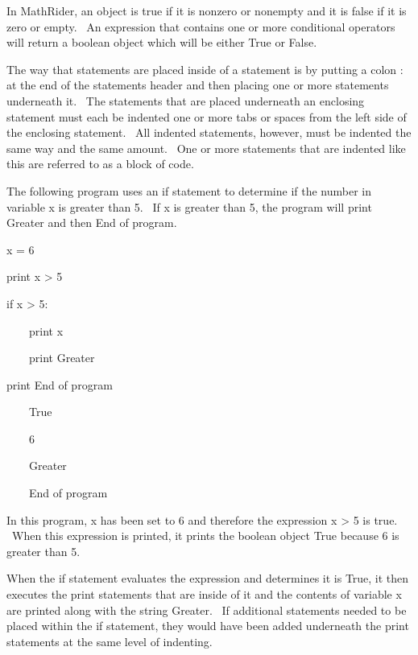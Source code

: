 \documentclass[12pt,twoside]{book}
\begin{document}
\bigskip

In MathRider, an object is {\textquotedbl}true{\textquotedbl} if it is nonzero or nonempty and it is {\textquotedbl}false{\textquotedbl} if it is zero or empty. \ An expression that contains one or more conditional operators will return a boolean object which will be either True or False. 

\bigskip

The way that statements are placed inside of a statement is by putting a colon {\textquotesingle}:{\textquotesingle} at the end of the statement{\textquotesingle}s header and then placing one or more statements underneath it. \ The statements that are placed underneath an enclosing statement must each be indented one or more tabs or spaces from the left side of the enclosing statement. \ All indented statements, however, must be indented the same way and the same amount. \ One or more statements that are indented like this are referred to as a block of code. 

\bigskip

The following program uses an if statement to determine if the number in variable x is greater than 5. \ If x is greater than 5, the program will print {\textquotedbl}Greater{\textquotedbl} and then {\textquotedbl}End of program{\textquotedbl}. 

\bigskip

x = 6


\bigskip

print x {\textgreater} 5


\bigskip

if x {\textgreater} 5:

\ \ \ \ print x

\ \ \ \ print {\textquotedbl}Greater{\textquotedbl}


\bigskip

print {\textquotedbl}End of program{\textquotedbl}

{\textbar}

\ \ \ \ True

\ \ \ \ 6

\ \ \ \ Greater

\ \ \ \ End of program

In this program, x has been set to 6 and therefore the expression x {\textgreater} 5 is true. \ When this expression is printed, it prints the boolean object True because 6 is greater than 5. 

\bigskip

When the if statement evaluates the expression and determines it is True, it then executes the print statements that are inside of it and the contents of variable x are printed along with the string {\textquotedbl}Greater{\textquotedbl}. \ If additional statements needed to be placed within the if statement, they would have been added underneath the print statements at the same level of indenting. 
\end{document}
